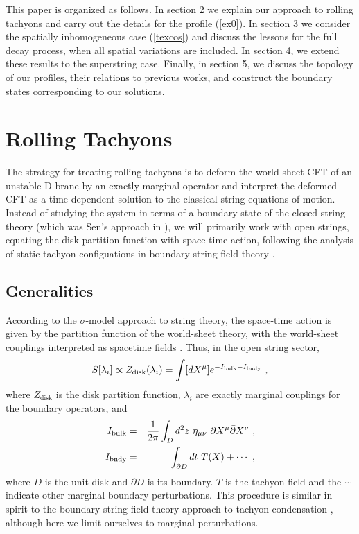 \documentclass[a4paper,12pt]{article}
\def\p{\partial}
\def\pb{\bar{\partial}}
\begin{document}
This paper is organized as follows. In section 2 we explain our approach to rolling tachyons and
carry out the details for the profile (\ref{ex0}). In section 3 we consider the spatially inhomogeneous case (\ref{texcos}) and discuss the lessons for the full decay process, 
when all spatial variations are included. In section 4, we extend these results to the 
superstring case. Finally, in section 5,  we  discuss the topology of our profiles, their
relations to previous works, and construct the boundary states 
corresponding to our solutions.


\section{Rolling Tachyons}
The strategy for treating rolling tachyons is to 
deform the world sheet CFT of an unstable D-brane by an exactly marginal operator and interpret the deformed CFT as a time dependent solution 
to the classical string equations of motion. 
Instead of studying the system in terms of a boundary state of the closed string theory (which was Sen's approach in \cite{Sen1,Sen2,senspac}), we will primarily work with open strings, equating the disk partition function with space-time action, following the
analysis of static tachyon configuations in boundary string field theory
\cite{Gerasimov:2000zp}. 

\subsection{Generalities}





According to the $\sigma$-model approach to string theory, the space-time action is given 
by the partition function of the world-sheet theory, with the world-sheet couplings interpreted
as spacetime fields \cite{fradkin-tseytlin}. Thus, in the open string sector,
\begin{equation}
S[\lambda_i] \propto  Z_{\mathrm{disk}}(\lambda_i)=\int [dX^\mu] e^{-I_{\rm bulk}-I_{\rm bndy}}~,
\label{action}
\end{equation}
where $Z_{\mathrm{disk}}$ is the disk partition function, $\lambda_i$ are exactly marginal
couplings for the boundary operators, and 
\begin{eqnarray}
I_{\rm bulk}&=&{1 \over 2 \pi } \int_D d^2z ~ \eta_{\mu \nu}~ \p X^\mu  \pb X^\nu~,  \\
I_{\rm bndy}& = & \int_{\p D} dt~ T(X) + \cdots~,
\end{eqnarray}
where $D$ is the unit disk and $\p D$ is its boundary. $T$ is the tachyon field and the $\cdots$ indicate other marginal boundary perturbations. This procedure is similar in spirit to the 
boundary string field theory approach to tachyon condensation \cite{Gerasimov:2000zp},
although here we limit ourselves to marginal perturbations. 
\end{document}
